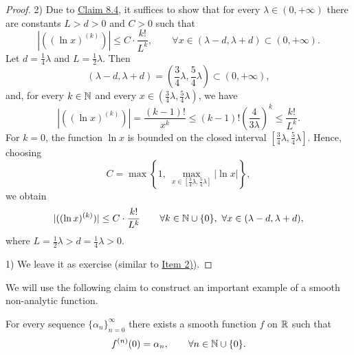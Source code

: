 \begin{proof}
2) Due to \hyperref[claim:8.4]{Claim 8.4}, it suffices to show that for every $\lambda\in(0,+\infty)$ there are constants $L>d>0$ and $C>0$ such that
\[
|((\ln x)^{(k)})|\leq C\cdot\frac{k!}{L^k},
\qquad \forall x\in(\lambda-d,\lambda+d)\subset(0,+\infty).
\]
Let $d=\frac14\lambda$ and $L=\frac12\lambda$. Then
\[
(\lambda-d,\lambda+d)=\left(\frac34\lambda,\frac54\lambda\right)\subset(0,+\infty),
\]
and, for every $k\in\mathbb{N}$ and every $x\in(\frac34\lambda,\frac54\lambda)$, we have
\[
|((\ln x)^{(k)})|
=\frac{(k-1)!}{x^k}
\leq (k-1)!\left(\frac{4}{3\lambda}\right)^k
\leq \frac{k!}{L^k}.
\]
For $k=0$, the function $\ln x$ is bounded on the closed interval
$[\frac34\lambda,\frac54\lambda]$. Hence, choosing
\[
C=\max\left\{1,\ \max_{x\in[\frac34\lambda,\frac54\lambda]}|\ln x|\right\},
\]
we obtain
\[
|((\ln x)^{(k)})|\leq C\cdot\frac{k!}{L^k}
\qquad\forall k\in\mathbb{N}\cup\{0\},\ \forall x\in(\lambda-d,\lambda+d),
\]
where $L=\frac12\lambda>d=\frac14\lambda>0$.

1) We leave it as exercise (similar to \hyperref[item:claim:8.5:2]{Item 2)}).
\end{proof}

We will use the following claim to construct an important example of a smooth non-analytic function.

\begin{claim}\label{claim:8.6}
For every sequence $\{\alpha_n\}_{n=0}^{\infty}$ there exists a smooth function $f$ on $\mathbb{R}$ such that
\[
f^{(n)}(0)=\alpha_n,
\qquad \forall n\in\mathbb{N}\cup\{0\}.
\]
\end{claim}

